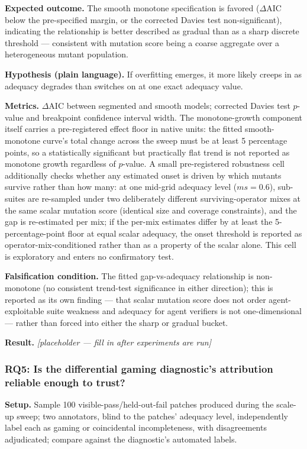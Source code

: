 \documentclass[11pt]{article}
\newcommand{\ph}{\textit{[placeholder --- fill in after experiments are run]}}
\begin{document}
\textbf{Expected outcome.} The smooth monotone specification is favored ($\Delta$AIC below the pre-specified margin, or the corrected Davies test non-significant), indicating the relationship is better described as gradual than as a sharp discrete threshold --- consistent with mutation score being a coarse aggregate over a heterogeneous mutant population.

\textbf{Hypothesis (plain language).} If overfitting emerges, it more likely creeps in as adequacy degrades than switches on at one exact adequacy value.

\textbf{Metrics.} $\Delta$AIC between segmented and smooth models; corrected Davies test $p$-value and breakpoint confidence interval width. The monotone-growth component itself carries a pre-registered effect floor in native units: the fitted smooth-monotone curve's total change across the sweep must be at least 5 percentage points, so a statistically significant but practically flat trend is not reported as monotone growth regardless of $p$-value. A small pre-registered robustness cell additionally checks whether any estimated onset is driven by which mutants survive rather than how many: at one mid-grid adequacy level ($ms = 0.6$), sub-suites are re-sampled under two deliberately different surviving-operator mixes at the same scalar mutation score (identical size and coverage constraints), and the gap is re-estimated per mix; if the per-mix estimates differ by at least the 5-percentage-point floor at equal scalar adequacy, the onset threshold is reported as operator-mix-conditioned rather than as a property of the scalar alone. This cell is exploratory and enters no confirmatory test.

\textbf{Falsification condition.} The fitted gap-vs-adequacy relationship is non-monotone (no consistent trend-test significance in either direction); this is reported as its own finding --- that scalar mutation score does not order agent-exploitable suite weakness and adequacy for agent verifiers is not one-dimensional --- rather than forced into either the sharp or gradual bucket.

\textbf{Result.} \ph

\subsubsection{RQ5: Is the differential gaming diagnostic's attribution reliable enough to trust?}
\textbf{Setup.} Sample 100 visible-pass/held-out-fail patches produced during the scale-up sweep; two annotators, blind to the patches' adequacy level, independently label each as gaming or coincidental incompleteness, with disagreements adjudicated; compare against the diagnostic's automated labels.
\end{document}
